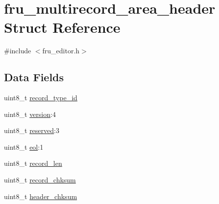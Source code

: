 \hypertarget{structfru__multirecord__area__header}{\section{fru\-\_\-multirecord\-\_\-area\-\_\-header Struct Reference}
\label{structfru__multirecord__area__header}
}


{\ttfamily \#include $<$fru\-\_\-editor.\-h$>$}

\subsection*{Data Fields}
\begin{DoxyCompactItemize}
\item 
uint8\-\_\-t \hyperlink{structfru__multirecord__area__header_a9c974380dbd24db377f8f6b2cffd6d3e}{record\-\_\-type\-\_\-id}
\item 
uint8\-\_\-t \hyperlink{structfru__multirecord__area__header_a5ce45c567b923c5b67e11ddc46863c3f}{version}\-:4
\item 
uint8\-\_\-t \hyperlink{structfru__multirecord__area__header_aaa2a56541a8e9d84e6b96470210e41b5}{reserved}\-:3
\item 
uint8\-\_\-t \hyperlink{structfru__multirecord__area__header_a5fd25613572ea7f09b06b004601a6f8e}{eol}\-:1
\item 
uint8\-\_\-t \hyperlink{structfru__multirecord__area__header_a88b33af5e5527c19733ce245bea0b13a}{record\-\_\-len}
\item 
uint8\-\_\-t \hyperlink{structfru__multirecord__area__header_a1acac8573c1ac44c857f99e9b17ef548}{record\-\_\-chksum}
\item 
uint8\-\_\-t \hyperlink{structfru__multirecord__area__header_a0236aea3fbae0b675889d123f0fb4dad}{header\-\_\-chksum}
\end{DoxyCompactItemize}


